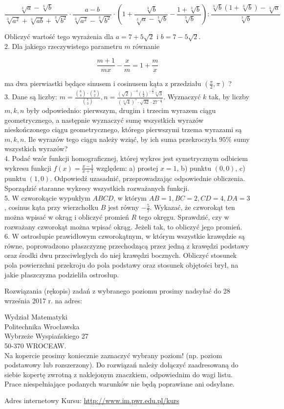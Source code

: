 \documentclass[10pt]{article}
\begin{document}
$$
\frac{\sqrt[3]{a}-\sqrt[3]{b}}{\sqrt[3]{a^{2}}+\sqrt[3]{a b}+\sqrt[3]{b^{2}}} \cdot \frac{a-b}{\sqrt[3]{a^{2}}-\sqrt[3]{b^{2}}} \cdot\left(1+\frac{\sqrt[3]{b}}{\sqrt[3]{a}-\sqrt[3]{b}}-\frac{1+\sqrt[3]{b}}{\sqrt[3]{b}}\right): \frac{\sqrt[3]{b}(1+\sqrt[3]{b})-\sqrt[3]{a}}{\sqrt[3]{b}}
$$

Obliczyć wartość tego wyrażenia dla $a=7+5 \sqrt{2}$ i $b=7-5 \sqrt{2}$.\\
2. Dla jakiego rzeczywistego parametru $m$ równanie

$$
\frac{m+1}{m x}-\frac{x}{m}=1+\frac{m}{x}
$$

ma dwa pierwiastki będące sinusem i cosinusem kąta z przedziału $\left(\frac{\pi}{2}, \pi\right)$ ?\\
3. Dane są liczby: $m=\frac{\binom{6}{4} \cdot\binom{8}{2}}{\binom{7}{3}}, n=\frac{(\sqrt{2})^{-4}\left(\frac{1}{4}\right)^{-\frac{5}{2}} \sqrt[4]{3}}{(\sqrt[4]{4})^{5} \cdot \sqrt{32} \cdot 27^{-\frac{1}{4}}}$. Wyznaczyć $k$ tak, by liczby $m, k, n$ były odpowiednio: pierwszym, drugim i trzecim wyrazem ciągu geometrycznego, a następnie wyznaczyć sumę wszystkich wyrazów nieskończonego ciągu geometrycznego, którego pierwszymi trzema wyrazami są $m, k, n$. Ile wyrazów tego ciągu należy wziąć, by ich suma przekroczyła $95 \%$ sumy wszystkich wyrazów?\\
4. Podać wzór funkcji homograficznej, której wykres jest symetrycznym odbiciem wykresu funkcji $f(x)=\frac{x-1}{x+1}$ względem: a) prostej $x=1$, b) punktu $(0,0)$, c) punktu $(1,0)$. Odpowiedź uzasadnić, przeprowadzając odpowiednie obliczenia. Sporządzić staranne wykresy wszystkich rozważanych funkcji.\\
5. W czworokącie wypukłym $A B C D$, w którym $A B=1, B C=2, C D=4, D A=3$, cosinus kąta przy wierzchołku $B$ jest równy $-\frac{5}{7}$. Wykazać, że czworokąt ten można wpisać w okrąg i obliczyć promień $R$ tego okręgu. Sprawdzić, czy w rozważany czworokąt można wpisać okrąg. Jeżeli tak, to obliczyć jego promień.\\
6. W ostrosłupie prawidłowym czworokątnym, w którym wszystkie krawędzie są równe, poprowadzono płaszczyznę przechodzącą przez jedną z krawędzi podstawy oraz środki dwu przeciwległych do niej krawędzi bocznych. Obliczyć stosunek pola powierzchni przekroju do pola podstawy oraz stosunek objętości brył, na jakie płaszczyzna podzieliła ostrosłup.

Rozwiązania (rękopis) zadań z wybranego poziomu prosimy nadsyłać do 28 września 2017 r. na adres:

Wydział Matematyki\\
Politechnika Wrocławska\\
Wybrzeże Wyspiańskiego 27\\
50-370 WROCEAW.\\
Na kopercie prosimy koniecznie zaznaczyć wybrany poziom! (np. poziom podstawowy lub rozszerzony). Do rozwiązań należy dołączyć zaadresowaną do siebie kopertę zwrotną z naklejonym znaczkiem, odpowiednim do wagi listu. Prace niespełniające podanych warunków nie będą poprawiane ani odsyłane.

Adres internetowy Kursu: \href{http://www.im.pwr.edu.pl/kurs}{http://www.im.pwr.edu.pl/kurs}
\end{document}
